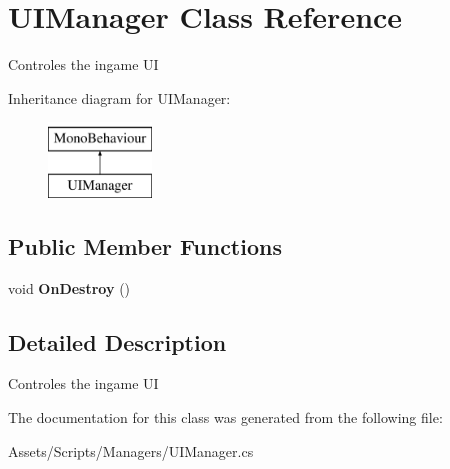 \hypertarget{class_u_i_manager}{}\section{U\+I\+Manager Class Reference}
\label{class_u_i_manager}


Controles the ingame UI  


Inheritance diagram for U\+I\+Manager\+:\begin{figure}[H]
\begin{center}
\leavevmode
\includegraphics[height=2.000000cm]{class_u_i_manager}
\end{center}
\end{figure}
\subsection*{Public Member Functions}
\begin{DoxyCompactItemize}
\item 
void {\bfseries On\+Destroy} ()\hypertarget{class_u_i_manager_a03255ab474c26f8da63d87821decd3e1}{}\label{class_u_i_manager_a03255ab474c26f8da63d87821decd3e1}

\end{DoxyCompactItemize}


\subsection{Detailed Description}
Controles the ingame UI 



The documentation for this class was generated from the following file\+:\begin{DoxyCompactItemize}
\item 
Assets/\+Scripts/\+Managers/U\+I\+Manager.\+cs\end{DoxyCompactItemize}
